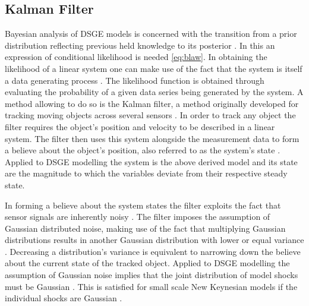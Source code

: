\documentclass[12pt,a4paper,english]{article} %
\begin{document}
	\subsection{Kalman Filter}
	Bayesian analysis of DSGE models is concerned with the transition from a prior distribution reflecting previous held knowledge to its posterior \cite{herbst_bayesian_2016}. In this an expression of conditional likelihood is needed \eqref{eq:blaw}. In obtaining the likelihood of a linear system one can make use of the fact that the system is itself a data generating process \cite{andrews_kalman_2008}. The likelihood function is obtained through evaluating the probability of a given data series being generated by the system. 
	A method allowing to do so is the Kalman filter, a method originally developed for tracking moving objects across several sensors \cite{kalman_new_1960}. In order to track any object the filter requires the object's position and velocity to be described in a linear system. The filter then uses this system alongside the measurement data to form a believe about the object's position, also referred to as the system's state \cite{andrews_kalman_2008}. Applied to DSGE modelling the system is the above derived model and its state are the magnitude to which the variables deviate from their respective steady state.	
	
	In forming a believe about the system states the filter exploits the fact that sensor signals are inherently noisy \cite{andrews_kalman_2008}. The filter imposes the assumption of Gaussian distributed noise, making use of the fact that multiplying Gaussian distributions results in another Gaussian distribution with lower or equal variance \cite{kalman_new_1960}. Decreasing a distribution's variance is equivalent to narrowing down the believe about the current state of the tracked object. Applied to DSGE modelling the assumption of Gaussian noise implies that the joint distribution of model shocks must be Gaussian \cite{herbst_bayesian_2016}. This is satisfied for small scale New Keynesian models if the individual shocks are Gaussian \cite{herbst_bayesian_2016}. 
	
\end{document}
